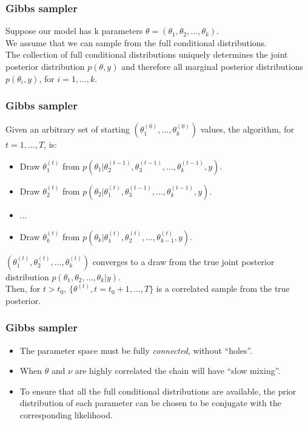 \documentclass{beamer}
\newcommand{\1}{\ensuremath{\mathbf{1}}}
\begin{document}
\begin{frame}\frametitle{Gibbs sampler}
	Suppose our model has k parameters $\theta = (\theta_1, \theta_2, ..., \theta_k )$.\\[1.5ex]
	We assume that we can sample from the full conditional distributions.\\[1.5ex]
	The collection of full conditional distributions uniquely determines the joint posterior distribution $p(\theta,y)$ and therefore all marginal posterior distributions $p(\theta_i,y)$, for $i = 1,\ldots,k$.
\end{frame}
%
%
%
\begin{frame}\frametitle{Gibbs sampler}
	Given an arbitrary set of starting $(\theta_1^{(0)}, ..., \theta_k^{(0)})$ values, the algorithm, for $t = 1,\ldots,T$, is:
	\begin{itemize}
		\item Draw $\theta_1^{(t)}$ from $p(\theta_1|\theta_2^{(t-1)},\theta_3^{(t-1)},\ldots,\theta_k^{(t-1)},y)$.
		\item Draw $\theta_2^{(t)}$ from $p(\theta_2|\theta_1^{(t)},\theta_3^{(t-1)},\ldots,\theta_k^{(t-1)},y)$.
		\item ...
		\item Draw $\theta_k^{(t)}$ from $p(\theta_k|\theta_1^{(t)},\theta_2^{(t)},\ldots,\theta_{k-1}^{(t)},y)$.
	\end{itemize}
	$(\theta_1^{(t)},\theta_2^{(t)},\ldots,\theta_{k}^{(t)})$ converges to a draw from the true joint posterior distribution $p(\theta_1,\theta_2,\ldots,\theta_k|y)$.\\[1.5ex]
	Then, for $t > t_0$, $\{\theta^{(t)},t = t_0 +1,\ldots,T\}$ is a correlated sample from the true posterior.
\end{frame}
%
%
%
\begin{frame}\frametitle{Gibbs sampler}
	\begin{itemize}
		\item The parameter space must be fully \emph{connected}, without ``holes''.
		\item When $\theta$ and $\nu$ are highly correlated the chain will have ``slow mixing''.
		\item To ensure that all the full conditional distributions are available, the prior distribution of each parameter can be chosen to be conjugate with the corresponding likelihood.
	\end{itemize}
\end{frame}
\end{document}
